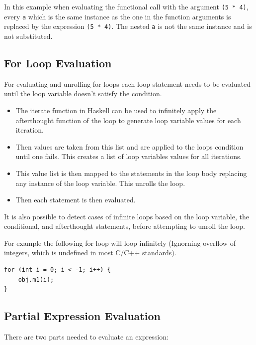 In this example when evaluating the functional call with the argument \texttt{(5 * 4)},
every \texttt{a} which is the same instance as the one in the function arguments
is replaced by the expression \texttt{(5 * 4)}. The nested \texttt{a} is not the same
instance and is not substituted.


\subsection{For Loop Evaluation}

For evaluating and unrolling for loops each loop statement needs to be evaluated
until the loop variable doesn't satisfy the condition. 

\begin{itemize}
\item The iterate function in Haskell can be used to infinitely apply the afterthought function
of the loop to generate loop variable values for each iteration.

\item Then values are taken from this list and are applied to the loops condition until
one fails. This creates a list of loop variables values for all iterations. 

\item This value list is then mapped to the statements in the loop body replacing any instance
of the loop variable. This unrolls the loop.

\item Then each statement is then evaluated. 
\end{itemize}


It is also possible to detect cases of infinite loops based on the loop variable, 
the conditional, and afterthought statements, before attempting to unroll the loop.

For example the following for loop will loop infinitely (Ignorning overflow of integers, which is undefined in most C/C++ standards).
\begin{lstlisting}[style=myGPC]
for (int i = 0; i < -1; i++) {
    obj.m1(i);
}
\end{lstlisting}


\subsection{Partial Expression Evaluation}
\label{sub:partial}

There are two parts needed to evaluate an expression:


